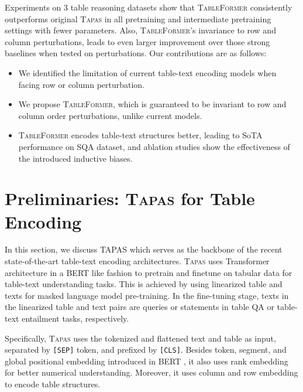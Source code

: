 \documentclass[11pt]{article}
\begin{document}
Experiments on 3 table reasoning datasets show that \textsc{TableFormer} consistently outperforms original \textsc{Tapas} in all pretraining and intermediate pretraining settings with fewer parameters. Also, \textsc{TableFormer}'s invariance to row and column perturbations, leads to even larger improvement over those strong baselines when tested on perturbations. Our contributions are as follows:
\begin{itemize}
    \item We identified the limitation of current table-text encoding models when facing row or column perturbation. 
    \item We propose \textsc{TableFormer}, which is guaranteed to be  invariant to row and column order perturbations, unlike current models.  
    \item \textsc{TableFormer} encodes table-text structures better, leading to SoTA performance on SQA dataset, and ablation studies show the effectiveness of the introduced inductive biases.
\end{itemize}

\section{Preliminaries: \textsc{Tapas} for Table Encoding}
In this section, we discuss \textsc{TAPAS} which serves as the backbone of the recent state-of-the-art table-text encoding architectures.
\textsc{Tapas} \cite{herzig-etal-2020-tapas} uses Transformer architecture in a BERT like fashion to pretrain and finetune on tabular data for table-text understanding tasks. This is achieved by using linearized table and texts for masked language model pre-training. In the fine-tuning stage, texts in the linearized table and text pairs are queries or statements in table QA or table-text entailment tasks, respectively. 

Specifically, \textsc{Tapas} uses the tokenized and flattened text and table as input, separated by \texttt{[SEP]} token, and prefixed by \texttt{[CLS]}. Besides token, segment, and global positional embedding introduced in BERT \cite{devlin2018bert}, it also uses rank embedding for better numerical understanding. Moreover, it uses column and row embedding to encode table structures. 
\end{document}
